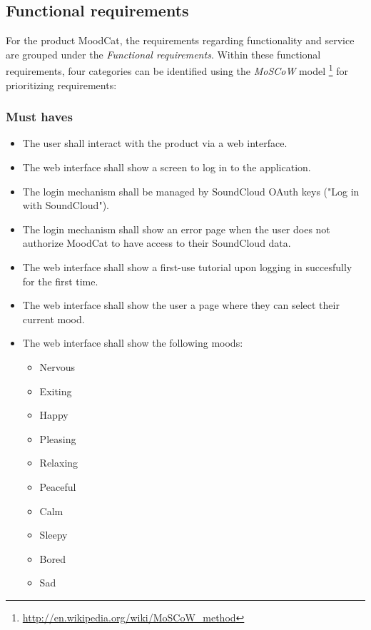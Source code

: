 
\subsection{Functional requirements}
For the product MoodCat, the requirements regarding functionality and service are grouped under the \emph{Functional requirements}.
Within these functional requirements, four categories can be identified using the \emph{MoSCoW} model \footnote{\url{http://en.wikipedia.org/wiki/MoSCoW_method}} for prioritizing requirements:

\subsubsection{Must haves}
\begin{itemize}
\item The user shall interact with the product via a web interface.

\item The web interface shall show a screen to log in to the application.

\item The login mechanism shall be managed by SoundCloud OAuth keys ("Log in with SoundCloud").

\item The login mechanism shall show an error page when the user does not authorize MoodCat to have access to their SoundCloud data.

\item The web interface shall show a first-use tutorial upon logging in succesfully for the first time.

\item The web interface shall show the user a page where they can select their current mood.

\item The web interface shall show the following moods:
		\begin{itemize}
		\item Nervous
		\item Exiting
		\item Happy
		\item Pleasing
		\item Relaxing
		\item Peaceful
		\item Calm
		\item Sleepy
		\item Bored
		\item Sad
		\end{itemize}


\end{itemize}
